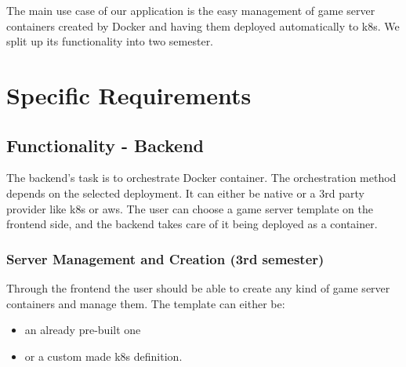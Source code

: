 \documentclass[a4paper,12pt,chapterprefix=false,bibliography=totoc,listof=totoc,]{scrreprt}
\begin{document}
The main use case of our application is the easy management of game server containers created by Docker and having them deployed automatically to \gls{k8s}. We split up its functionality into two semester.

\chapter{Specific Requirements}

\section{Functionality - Backend}


The backend's task is to orchestrate Docker container. The orchestration method depends on the selected deployment. It can either be native or a 3rd party provider like \gls{k8s} or \gls{aws}. The user can choose a game server template on the frontend side, and the backend takes care of it being deployed as a container.

\subsection{Server Management and Creation (3rd semester)}
Through the frontend the user should be able to create any kind of game server containers and manage them. The template can either be:
\begin{itemize}
	\item an already pre-built one 
	\item or a custom made \gls{k8s} definition.
\end{itemize}
 
\end{document}
